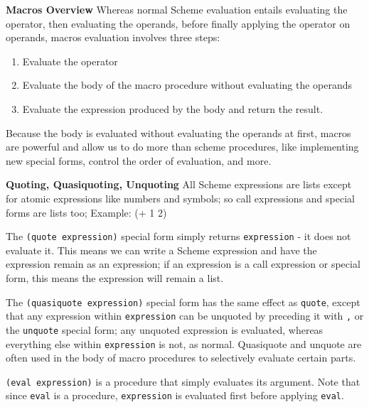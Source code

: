 \textbf{Macros Overview} Whereas normal Scheme evaluation entails evaluating the operator, then evaluating the operands, before finally applying the operator on operands, macros evaluation involves three steps:

\begin{enumerate}[1.]
\item Evaluate the operator
\item Evaluate the body of the macro procedure without evaluating the operands
\item Evaluate the expression produced by the body and return the result.
\end{enumerate}

Because the body is evaluated without evaluating the operands at first, macros are powerful and allow us to do more than scheme procedures, like implementing new special forms, control the order of evaluation, and more. 

\textbf{Quoting, Quasiquoting, Unquoting} All Scheme expressions are lists except for atomic expressions like numbers and symbols; so call expressions and special forms are lists too; Example: (+ 1 2)

The \texttt{(quote expression)} special form simply returns \texttt{expression} - it does not evaluate it. This means we can write a Scheme expression and have the expression remain as an expression; if an expression is a call expression or special form, this means the expression will remain a list. 

The \texttt{(quasiquote expression)} special form has the same effect as \texttt{quote}, except that any expression within \texttt{expression} can be unquoted by preceding it with \texttt{,} or the \texttt{unquote} special form; any unquoted expression is evaluated, whereas everything else within \texttt{expression} is not, as normal. Quasiquote and unquote are often used in the body of macro procedures to selectively evaluate certain parts. 

\texttt{(eval expression)} is a procedure that simply evaluates its argument. Note that since \texttt{eval} is a procedure, \texttt{expression} is evaluated first before applying \texttt{eval}.
